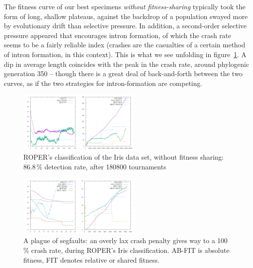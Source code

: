 
The fitness curve of our best
specimens \textit{without fitness-sharing} typically took the form of long, shallow plateaus, against the backdrop of a population swayed more by evolutionary
drift than selective pressure.  In addition, a second-order selective pressure appeared that encourages intron formation,
of which the crash rate seems to be a fairly reliable index
(crashes are the casualties of a certain method of intron
formation, in this context). This is what we see unfolding in
figure~\ref{fig:good-nosharing}. A dip in average length coincides with the peak in the crash rate, around phylogenic generation 350 -- though there is a great deal of
back-and-forth between the two curves, as if the two strategies
for intron-formation are competing.%

\begin{figure}
  \includegraphics[width=\columnwidth,height=3cm]{examples/iris/good-nosharing/good-nosharing.png}
  \caption{ROPER's classification of the Iris data set, without
  fitness sharing: 86.8\,\% detection rate, after 180800
  tournaments}
  \label{fig:good-nosharing}
\end{figure}

\begin{figure}
  \includegraphics[width=\columnwidth,height=3cm]{examples/iris/plague/plague.png}
  \caption{A plague of segfaults: an overly lax crash penalty
  gives way to a 100\,\% crash rate, during ROPER's Iris
  classification. {AB-FIT} is absolute fitness,
  FIT denotes relative or shared fitness.}
  \label{fig:plague}
\end{figure}

